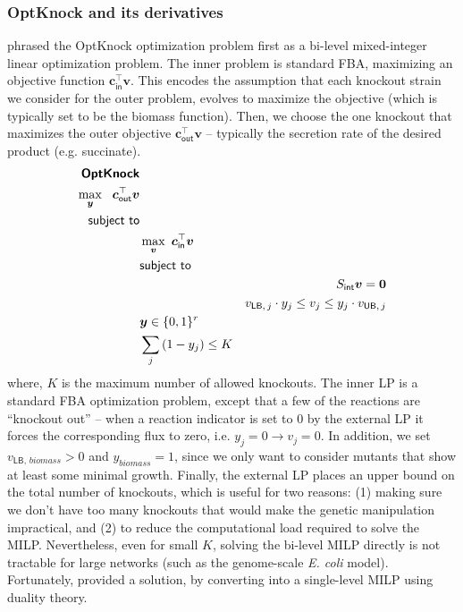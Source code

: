 \documentclass[10pt,a4paper]{article}
\newcommand{\mymatrix}[1]{#1}
\newcommand{\myvector}[1]{{\boldsymbol{#1}}}
\newcommand{\stoichmatint}{\mymatrix{S}_{\mathsf{int}}}
\begin{document}
\subsubsection{OptKnock and its derivatives}
\textcite{burgard_optknock_2003-1} phrased the OptKnock optimization problem first as a bi-level mixed-integer linear optimization problem. The inner problem is standard FBA, maximizing an objective function $\myvector{c}_\textsf{in}^\top \myvector{v}$. This encodes the assumption that each knockout strain we consider for the outer problem, evolves to maximize the objective (which is typically set to be the biomass function). Then, we choose the one knockout that maximizes the outer objective $\myvector{c}_\textsf{out}^\top \myvector{v}$ -- typically the secretion rate of the desired product (e.g. succinate).
\begin{eqnarray}
\textsf{\textbf{OptKnock}} && \nonumber\\
\max_{\myvector{y}}~~\myvector{c}_{\textsf{out}}^\top \myvector{v}&&\nonumber\\
\textsf{subject to}&&\nonumber\\
&\max_{\myvector{v}}~\myvector{c}_{\textsf{in}}^\top \myvector{v}&\nonumber\\
&\textsf{subject to}&\nonumber\\
&&\stoichmatint \myvector{v} = \myvector{0} \nonumber\\
&&v_{\textsf{LB},\,j} \cdot y_j \leq v_j \leq y_j \cdot v_{\textsf{UB},\,j} \nonumber\\
&\myvector{y} \in \{0, 1\}^r \nonumber\\
&\sum_j{(1-y_j)} \leq K & \label{eq:optknock}
\end{eqnarray}
where, $K$ is the maximum number of allowed knockouts. The inner LP is a standard FBA optimization problem, except that a few of the reactions are ``knockout out'' -- when a reaction indicator is set to 0 by the external LP it forces the corresponding flux to zero, i.e. $y_j = 0 \rightarrow v_j = 0$. In addition, we set $v_{\textsf{LB},\,biomass} > 0$ and $y_{biomass} = 1$, since we only want to consider mutants that show at least some minimal growth. Finally, the external LP places an upper bound on the total number of knockouts, which is useful for two reasons: (1) making sure we don't have too many knockouts that would make the genetic manipulation impractical, and (2) to reduce the computational load required to solve the MILP. Nevertheless, even for small $K$, solving the bi-level MILP  directly is not tractable for large networks (such as the genome-scale \textit{E. coli} model). Fortunately, \textcite{burgard_optknock_2003-1} provided a solution, by converting into a single-level MILP using duality theory.
\end{document}
